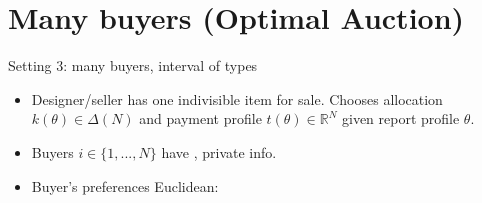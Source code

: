 \documentclass[english,10pt
,aspectratio=169
]{beamer}
\begin{document}
%
%
%
%
%


\section{Many buyers (Optimal Auction)}

\begin{frame}{Setting 3: many buyers, interval of types}
\begin{itemize}
	\item Designer/seller has one indivisible item for sale. Chooses allocation $k(\theta) \in \varDelta(N)$ and payment profile $t(\theta) \in \mathbb{R}^N$ given report profile $\theta$.
	\item Buyers $i \in \{1,...,N\}$ have , private info.
	\item Buyer's preferences Euclidean: 
\end{itemize}
\end{frame}
\end{document}
